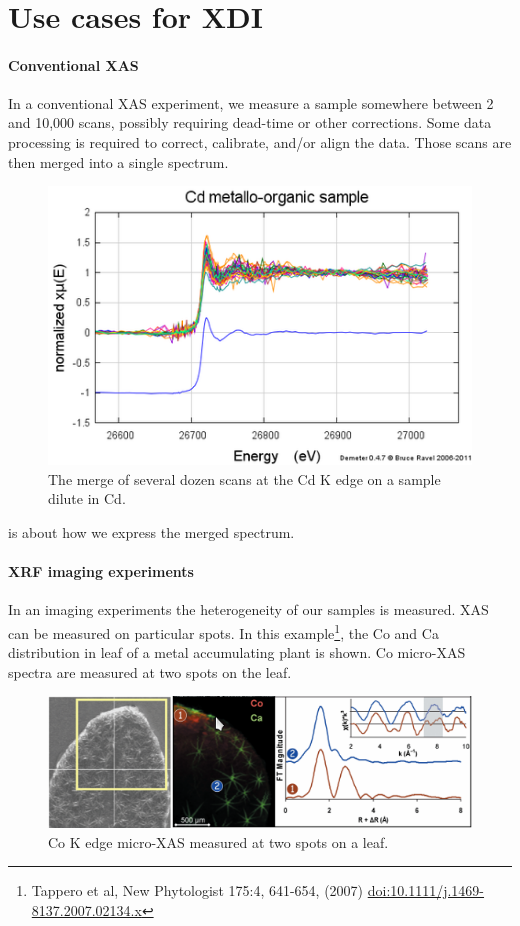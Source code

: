 \documentclass{article}
\begin{document}
~

\section*{Use cases for XDI}
\label{sec:background}

\paragraph{Conventional XAS}

In a conventional XAS experiment, we measure a sample somewhere
between 2 and 10,000 scans, possibly requiring dead-time or other
corrections.  Some data processing is required to correct, calibrate,
and/or align the data.  Those scans are then merged into a single
spectrum.

\begin{figure}[h]
  \centering
  \includegraphics[width=0.5\linewidth]{convxas.png}
  \caption{The merge of several dozen scans at the Cd K edge on a sample dilute in Cd.}
  \label{fig:convxas}
\end{figure}

{\xdi} is about how we express the merged spectrum.

\paragraph{XRF imaging experiments}

In an imaging experiments the heterogeneity of our samples is
measured. XAS can be measured on particular spots.  In this
example\footnote{Tappero et al, New Phytologist 175:4, 641-654, (2007)
  \href{http://dx.doi.org/10.1111/j.1469-8137.2007.02134.x}
  {doi:10.1111/j.1469-8137.2007.02134.x}}, the Co and Ca distribution
in leaf of a metal accumulating plant is shown.  Co micro-XAS spectra
are measured at two spots on the leaf.

\begin{figure}[h]
  \centering
  \includegraphics[width=0.7\linewidth]{xrfxas.png}
  \caption{Co K edge micro-XAS measured at two spots on a leaf.}
  \label{fig:xrf}
\end{figure}
\end{document}
